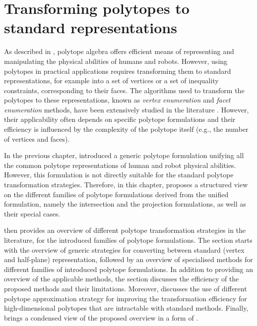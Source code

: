 

\chapter{Transforming polytopes to standard representations}
\label{ch:transformin_polytopes}

As described in , polytope algebra offers efficient means of representing and manipulating the physical abilities of humans and robots. However, using polytopes in practical applications requires transforming them to standard representations, for example into a set of vertices or a set of inequality constraints, corresponding to their faces. The algorithms used to transform the polytopes to these representations, known as \textit{vertex enumeration} and \textit{facet enumeration} methods, have been extensively studied in the literature \cite{fukuda2004frequently}. However, their applicability often depends on specific polytope formulations and their efficiency is influenced by the complexity of the polytope itself (e.g., the number of vertices and faces).

In the previous chapter,  introduced a generic polytope formulation unifying all the common polytope representations of human and robot physical abilities. However, this formulation is not directly suitable for the standard polytope transformation strategies. Therefore, in this chapter,  proposes a structured view on the different families of polytope formulations derived from the unified formulation, namely the intersection and the projection formulations, as well as their special cases. 

 then provides an overview of different polytope transformation strategies in the literature, for the introduced families of polytope formulations. The section starts with the overview of generic strategies for converting between standard (vertex and half-plane) representation, followed by an overview of specialised methods for different families of introduced polytope formulations. In addition to providing an overview of the applicable methods, the section discusses the efficiency of the proposed methods and their limitations. Moreover,  discusses the use of different polytope approximation strategy for improving the transformation efficiency for high-dimensional polytopes that are intractable with standard methods. Finally,  brings a condensed view of the proposed overview in a form of .

